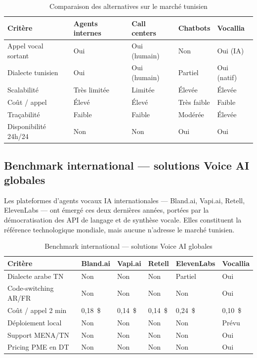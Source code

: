 \begin{table}[H]
\centering
\caption{Comparaison des alternatives sur le marché tunisien}
\smallskip
\begin{tabular}{|p{3cm}|l|l|l|l|}
\hline
\textbf{Critère} & \textbf{Agents internes} & \textbf{Call centers} & \textbf{Chatbots} & \textbf{Vocallia} \\
\hline
Appel vocal sortant & Oui & Oui (humain) & Non & Oui (IA) \\
\hline
Dialecte tunisien & Oui & Oui (humain) & Partiel & Oui (natif) \\
\hline
Scalabilité & Très limitée & Limitée & Élevée & Élevée \\
\hline
Coût / appel & Élevé & Élevé & Très faible & Faible \\
\hline
Traçabilité & Faible & Faible & Modérée & Élevée \\
\hline
Disponibilité 24h/24 & Non & Non & Oui & Oui \\
\hline
\end{tabular}
\end{table}


\subsection{Benchmark international --- solutions Voice AI globales}
\label{section2.5.2}

Les plateformes d'agents vocaux IA internationales --- Bland.ai, Vapi.ai, Retell, ElevenLabs --- ont émergé ces deux dernières années, portées par la démocratisation des API de langage et de synthèse vocale. Elles constituent la référence technologique mondiale, mais aucune n'adresse le marché tunisien.

\begin{table}[H]
\centering
\caption{Benchmark international --- solutions Voice AI globales}
\smallskip
\begin{tabular}{|p{2.8cm}|l|l|l|l|l|}
\hline
\textbf{Critère} & \textbf{Bland.ai} & \textbf{Vapi.ai} & \textbf{Retell} & \textbf{ElevenLabs} & \textbf{Vocallia} \\
\hline
Dialecte arabe TN & Non & Non & Non & Partiel & Oui \\
\hline
Code-switching AR/FR & Non & Non & Non & Non & Oui \\
\hline
Coût / appel 2 min & 0,18~\$ & 0,14~\$ & 0,14~\$ & 0,24~\$ & 0,10~\$ \\
\hline
Déploiement local & Non & Non & Non & Non & Prévu \\
\hline
Support MENA/TN & Non & Non & Non & Non & Oui \\
\hline
Pricing PME en DT & Non & Non & Non & Non & Oui \\
\hline
\end{tabular}
\end{table}


